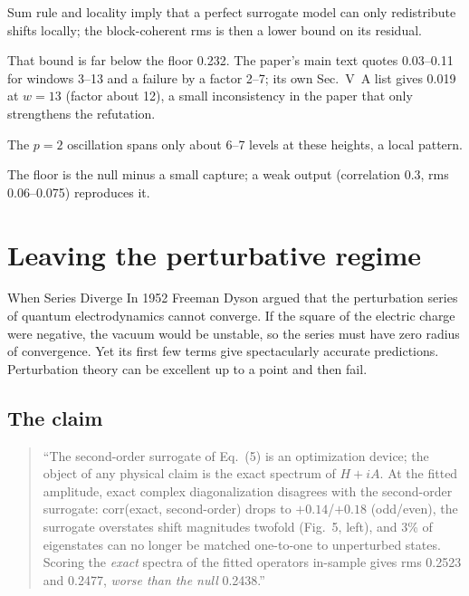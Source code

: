 \begin{keyideas}
\item Sum rule and locality imply that a perfect surrogate model can only redistribute shifts locally; the block-coherent rms is then a lower bound on its residual.
\item That bound is far below the floor 0.232. The paper's main text quotes 0.03--0.11 for windows 3--13 and a failure by a factor 2--7; its own Sec.~V~A list gives 0.019 at $w=13$ (factor about 12), a small inconsistency in the paper that only strengthens the refutation.
\item The $p=2$ oscillation spans only about 6--7 levels at these heights, a local pattern.
\item The floor is the null minus a small capture; a weak output (correlation 0.3, rms 0.06--0.075) reproduces it.
\end{keyideas}

\section{Leaving the perturbative regime}\label{sec:paper-spurious-floor-exact}
\begin{didyouknow}{When Series Diverge}
In 1952 Freeman Dyson argued that the perturbation series of quantum electrodynamics cannot converge. If the square of the electric charge were negative, the vacuum would be unstable, so the series must have zero radius of convergence. Yet its first few terms give spectacularly accurate predictions. Perturbation theory can be excellent up to a point and then fail.
\end{didyouknow}

\subsection{The claim}

\begin{quote}
``The second-order surrogate of Eq.~(5) is an optimization device; the object of any physical claim is the exact spectrum of $H+iA$. At the fitted amplitude, exact complex diagonalization disagrees with the second-order surrogate: corr(exact, second-order) drops to $+0.14$/$+0.18$ (odd/even), the surrogate overstates shift magnitudes twofold (Fig.~5, left), and 3\% of eigenstates can no longer be matched one-to-one to unperturbed states. Scoring the \emph{exact} spectra of the fitted operators in-sample gives rms 0.2523 and 0.2477, \emph{worse than the null} 0.2438.''
\end{quote}

